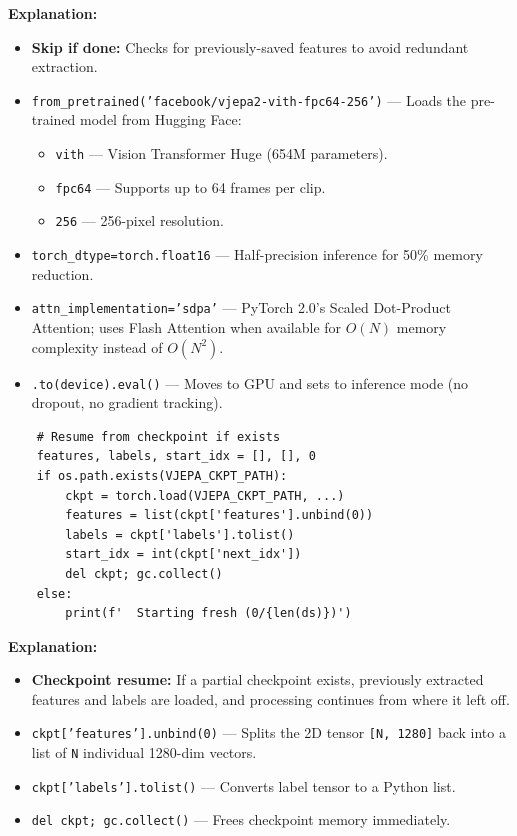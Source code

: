 \documentclass[a4paper, 12pt]{article}
\newenvironment{explanation}{%
  \par\smallskip
  \noindent\textcolor{blue!70!black}{\textbf{Explanation:}}\\
  \noindent
}{\par\medskip}
\begin{document}
\begin{explanation}
\begin{itemize}[nosep]
  \item \textbf{Skip if done:} Checks for previously-saved features to avoid redundant extraction.
  \item \texttt{from\_pretrained('facebook/vjepa2-vith-fpc64-256')} --- Loads the pre-trained model from Hugging Face:
  \begin{itemize}[nosep]
    \item \texttt{vith} --- Vision Transformer Huge (654M parameters).
    \item \texttt{fpc64} --- Supports up to 64 frames per clip.
    \item \texttt{256} --- 256-pixel resolution.
  \end{itemize}
  \item \texttt{torch\_dtype=torch.float16} --- Half-precision inference for 50\% memory reduction.
  \item \texttt{attn\_implementation='sdpa'} --- PyTorch 2.0's Scaled Dot-Product Attention; uses Flash Attention when available for $O(N)$ memory complexity instead of $O(N^2)$.
  \item \texttt{.to(device).eval()} --- Moves to GPU and sets to inference mode (no dropout, no gradient tracking).
\end{itemize}
\end{explanation}

\begin{lstlisting}
    # Resume from checkpoint if exists
    features, labels, start_idx = [], [], 0
    if os.path.exists(VJEPA_CKPT_PATH):
        ckpt = torch.load(VJEPA_CKPT_PATH, ...)
        features = list(ckpt['features'].unbind(0))
        labels = ckpt['labels'].tolist()
        start_idx = int(ckpt['next_idx'])
        del ckpt; gc.collect()
    else:
        print(f'  Starting fresh (0/{len(ds)})')
\end{lstlisting}

\begin{explanation}
\begin{itemize}[nosep]
  \item \textbf{Checkpoint resume:} If a partial checkpoint exists, previously extracted features and labels are loaded, and processing continues from where it left off.
  \item \texttt{ckpt['features'].unbind(0)} --- Splits the 2D tensor \texttt{[N, 1280]} back into a list of \texttt{N} individual 1280-dim vectors.
  \item \texttt{ckpt['labels'].tolist()} --- Converts label tensor to a Python list.
  \item \texttt{del ckpt; gc.collect()} --- Frees checkpoint memory immediately.
\end{itemize}
\end{explanation}
\end{document}
